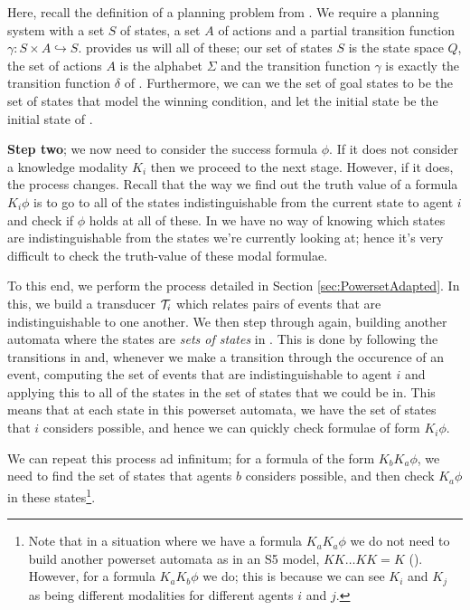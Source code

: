\documentclass[12pt, a4paper]{article}
\begin{document}
Here, recall the definition of a planning problem from . We
require a planning system with a set $S$ of states, a set $A$ of actions and a
partial transition function $\gamma : S \times A \hookrightarrow S$. \mestar
provides us will all of these; our set of states $S$ is the state space $Q$, the
set of actions $A$ is the alphabet $\Sigma$ and the transition function $\gamma$
is exactly the transition function $\delta$ of \mestar. Furthermore, we can we
the set of goal states to be the set of states that model the winning condition,
and let the initial state be the initial state of \mestar.

\bigskip

\textbf{Step two}; we now need to consider the success formula $\phi$. If it
does not consider a knowledge modality $K_i$ then we proceed to the next stage.
However, if it does, the process changes. Recall that the way we find out the
truth value of a formula $K_i \phi$ is to go to all of the states
indistinguishable from the current state to agent $i$ and check if $\phi$ holds
at all of these. In \mestar we have no way of knowing which states are
indistinguishable from the states we're currently looking at; hence it's very
difficult to check the truth-value of these modal formulae.

To this end, we perform the process detailed in Section
\ref{sec:PowersetAdapted}. In this, we build a transducer $\mathcal{T}_i$ which
relates pairs of events that are indistinguishable to one another. We then step
through \mestar again, building another automata where the states are
\textit{sets of states} in \mestar. This is done by following the transitions in
\mestar and, whenever we make a transition through the occurence of an event,
computing the set of events that are indistinguishable to agent $i$ and applying
this to all of the states in the set of states that we could be in. This means
that at each state in this powerset automata, we have the set of states that $i$
considers possible, and hence we can quickly check formulae of form $K_i \phi$. 

We can repeat this process ad infinitum; for a formula of the form $K_b K_a
\phi$, we need to find the set of states that agents $b$ considers possible, and
then check $K_a \phi$ in these states\footnote{Note that in a situation where we have a
  formula $K_a K_a \phi$ we do not need to build another powerset automata as in
  an \textsf{S5} model, $KK \ldots KK = K$ (\cite{ModalLogic}). However, for a
  formula $K_a K_b \phi$ we do; this is because we can see $K_i$ and $K_j$ as
  being different modalities for different agents $i$ and $j$.}.
\end{document}
